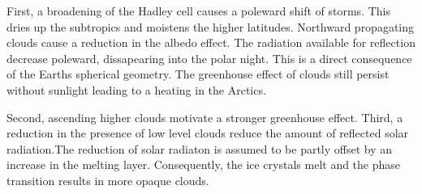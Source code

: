 First, a broadening of the Hadley cell causes a poleward shift of storms. This dries up the subtropics and moistens the higher latitudes. Northward propagating clouds cause a reduction in the albedo effect. The radiation available for reflection decrease poleward, dissapearing into the polar night. This is a direct consequence of the Earths spherical geometry.
The greenhouse effect of clouds still persist without sunlight leading to a heating in the Arctics.

Second, ascending higher clouds motivate a stronger greenhouse effect. Third, a reduction in the presence of low level clouds reduce the amount of reflected solar radiation.The reduction of solar radiaton is assumed to be partly offset by an increase in the melting layer. Consequently, the ice crystals melt and the phase transition results in more opaque clouds. 
